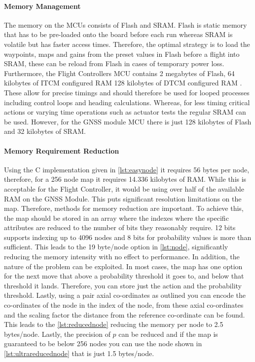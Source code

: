 \paragraph{Memory Management}
The memory on the \gls{MCU}s consists of Flash and \gls{SRAM}. Flash is static memory that has to be pre-loaded onto the board before each run whereas \gls{SRAM} is volatile but has faster access times. Therefore, the optimal strategy is to load the waypoints, maps and gains from the preset values in Flash before a flight into \gls{SRAM}, these can be reload from Flash in cases of temporary power loss. Furthermore, the Flight Controllers \gls{MCU} contains 2 megabytes of Flash, 64 kilobytes of \gls{ITCM} configured \gls{RAM} 128 kilobytes of \gls{DTCM} configured \gls{RAM} \cite{REF}. These allow for precise timings and should therefore be used for looped processes including control loops and heading calculations. Whereas, for less timing critical actions or varying time operations such as actuator tests the regular \gls{SRAM} can be used. However, for the \gls{GNSS} module \gls{MCU} there is just 128 kilobytes of Flash and 32 kilobytes of \gls{SRAM}.
\paragraph{Memory Requirement Reduction}
Using the C implementation given in \ref{lst:easynode} it requires 56 bytes per node, therefore, for a 256 node map it requires 14.336 kilobytes of \gls{RAM}. While this is acceptable for the Flight Controller, it would be using over half of the available \gls{RAM} on the \gls{GNSS} Module. This puts significant resolution limitations on the map. Therefore, methods for memory reduction are important. To achieve this, the map should be stored in an array where the indexes where the specific attributes are reduced to the number of bits they reasonably require. 12 bits supports indexing up to 4096 nodes and 8 bits for probability values is more than sufficient. This leads to the 19 byte/node option in \ref{lst:node}, significantly reducing the memory intensity with no effect to performance. In addition, the nature of the problem can be exploited. In most cases, the map has one option for the next move that above a probability threshold it goes to, and below that threshold it lands. Therefore, you can store just the action and the probability threshold. Lastly, using a pair axial co-ordinates as outlined \cite{REF} you can encode the co-ordinates of the node in the index of the node, from these axial co-ordinates and the scaling factor the distance from the reference co-ordinate can be found. This leads to the \ref{lst:reducednode} reducing the memory per node to 2.5 bytes/node. Lastly, the precision of $p$ can be reduced and if the map is guaranteed to be below 256 nodes you can use the node shown in \ref{lst:ultrareducednode} that is just 1.5 bytes/node. 
